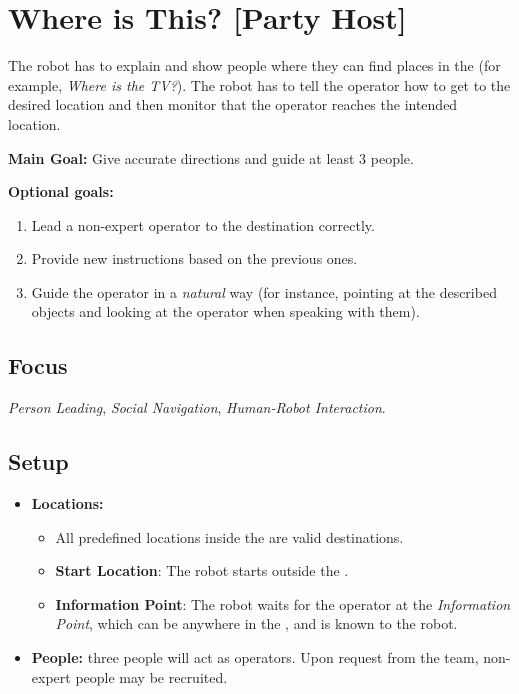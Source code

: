 \section{Where is This? [Party Host]}
\label{test:where-is-this}
The robot has to explain and show people where they can find places in the \Arena{} (for example, \emph{Where is the TV?}). The robot has to tell the operator how to get to the desired location and then monitor that the operator reaches the intended location.

\noindent \textbf{Main Goal:} Give accurate directions and guide at least 3 people.

\noindent \textbf{Optional goals:}
\begin{enumerate}[nosep]
	\item Lead a non-expert operator to the destination correctly.
	\item Provide new instructions based on the previous ones.
	\item Guide the operator in a \emph{natural} way (for instance, pointing at the described objects and looking at the operator when speaking with them).
\end{enumerate}

\subsection*{Focus}
\emph{Person Leading}, \emph{Social Navigation}, \emph{Human-Robot Interaction}.


\subsection*{Setup}
\begin{itemize}[nosep]
	\item \textbf{Locations:} 
	\begin{itemize}
	 \item All predefined locations inside the \Arena{} are valid destinations.
	 \item \textbf{Start Location}:  The robot starts outside the \Arena{}. 
	 \item \textbf{Information Point}: The robot waits for the operator at the \emph{Information Point}, which can be anywhere in the \Arena{}, and is known to the robot. 
	\end{itemize}
		\item \textbf{People:} three people will act as operators. Upon request from the team, non-expert people may be recruited.
\end{itemize}


